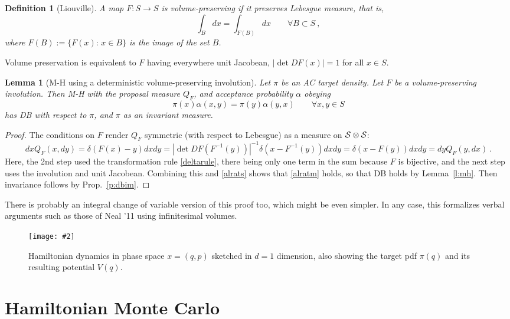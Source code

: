\documentclass[10pt]{article}
\newcommand{\be}{\begin{equation}}
\newcommand{\ee}{\end{equation}}
\newcommand{\bfi}{\begin{figure}}
\newcommand{\efi}{\end{figure}}
\newcommand{\ca}[2]{\caption{#1 \label{#2}}}
\newcommand{\ig}[2]{\texttt{[image: \#2]}}
\newtheorem{lem}[thm]{Lemma}
\newtheorem{dfn}[thm]{Definition}
\newcommand{\al}{\alpha}
\begin{document}
\begin{dfn}[Liouville]
  A map $F:S\to S$ is volume-preserving if it preserves Lebesgue measure,
  that is,
  $$
  \int_B dx = \int_{F(B)} dx \qquad \forall B \subset S~,
  $$
  where $F(B):=\{F(x): \, x\in B\}$ is the image of the set $B$.
\end{dfn}
Volume preservation is equivalent to $F$ having everywhere unit Jacobean,
$|\det DF(x)| = 1$ for all $x\in S$.

\begin{lem}[M-H using a deterministic volume-preserving involution]
  Let $\pi$ be an AC target density.
  Let $F$ be a volume-preserving involution.
  Then M-H with the proposal measure $Q_F$, and acceptance
  probability $\al$ obeying
  \be
  \pi(x) \al(x,y) = \pi(y) \al(y,x)   \qquad \forall x,y \in S
  \label{alrats}
  \ee
  has DB with respect to $\pi$, and $\pi$ as an invariant measure.
  \label{l:mhmap}
\end{lem}
\begin{proof}
  The conditions on $F$ render $Q_F$ symmetric (with respect to Lebesgue)
  as a measure on $\cal S \otimes \cal S$:
  $$
  dx Q_F(x,dy) = \delta(F(x)-y) dxdy =
  |\det DF(F^{-1}(y))|^{-1} \delta(x - F^{-1}(y)) dxdy =
  \delta(x-F(y)) dxdy =
  dy Q_F(y,dx)~.
  $$
  Here, the 2nd step used the transformation rule \eqref{deltarule}, there being
  only one term in the sum because $F$ is bijective, and
  the next step uses the involution and unit Jacobean.
  Combining this and \eqref{alrats} shows that \eqref{alratm} holds,
  so that DB holds by Lemma~\ref{l:mh}.
  Then invariance follows by Prop.~\ref{p:dbim}.
\end{proof}

There is probably an integral change of variable version of this proof too,
which might be even simpler.
In any case, this formalizes verbal arguments such as those of Neal '11 using infinitesimal
volumes.


\bfi  %
\centering\ig{width=2.5in}{hamil.eps}
\ca{Hamiltonian dynamics in phase space $x=(q,p)$ sketched in $d=1$ dimension, also showing the target pdf $\pi(q)$ and its resulting potential $V(q)$.}{f:hamil}
\efi


\section{Hamiltonian Monte Carlo}
\end{document}
